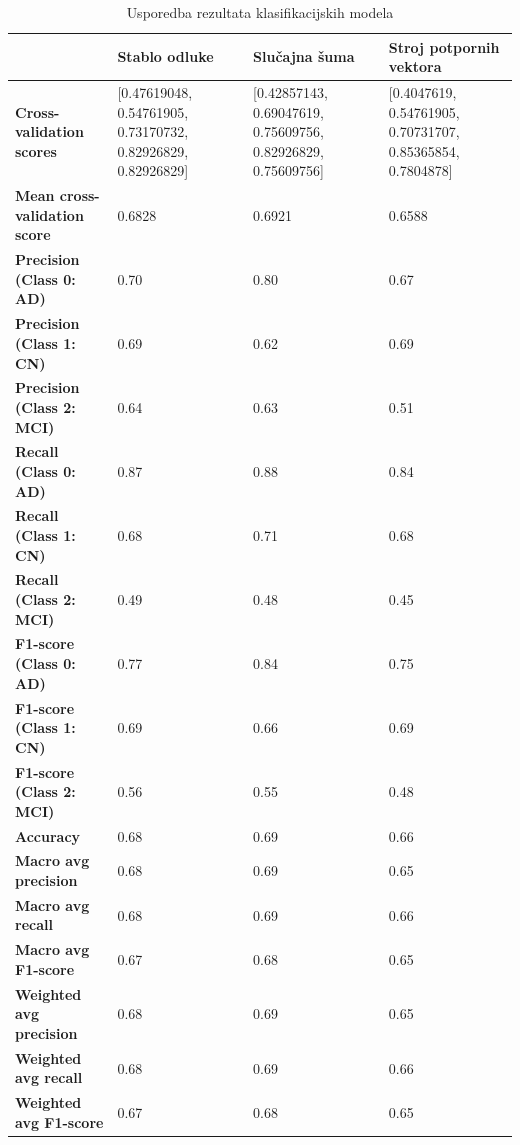 \documentclass[zavrsnirad,upload]{fer}
\begin{document}
\begin{table}[h!]
	\centering
	\begin{tabularx}{\textwidth}{|X|X|X|X|}
		\hline
		& \textbf{Stablo odluke} & \textbf{Slučajna šuma} & \textbf{Stroj potpornih vektora} \\ \hline
		\textbf{Cross-validation scores} & [0.47619048, 0.54761905, 0.73170732, 0.82926829, 0.82926829] & [0.42857143, 0.69047619, 0.75609756, 0.82926829, 0.75609756] & [0.4047619, 0.54761905, 0.70731707, 0.85365854, 0.7804878] \\ \hline
		\textbf{Mean cross-validation score} & 0.6828 & 0.6921 & 0.6588 \\ \hline
		\textbf{Precision (Class 0: AD)} & 0.70 & 0.80 & 0.67 \\ \hline
		\textbf{Precision (Class 1: CN)} & 0.69 & 0.62 & 0.69 \\ \hline
		\textbf{Precision (Class 2: MCI)} & 0.64 & 0.63 & 0.51 \\ \hline
		\textbf{Recall (Class 0: AD)} & 0.87 & 0.88 & 0.84 \\ \hline
		\textbf{Recall (Class 1: CN)} & 0.68 & 0.71 & 0.68 \\ \hline
		\textbf{Recall (Class 2: MCI)} & 0.49 & 0.48 & 0.45 \\ \hline
		\textbf{F1-score (Class 0: AD)} & 0.77 & 0.84 & 0.75 \\ \hline
		\textbf{F1-score (Class 1: CN)} & 0.69 & 0.66 & 0.69 \\ \hline
		\textbf{F1-score (Class 2: MCI)} & 0.56 & 0.55 & 0.48 \\ \hline
		\textbf{Accuracy} & 0.68 & 0.69 & 0.66 \\ \hline
		\textbf{Macro avg precision} & 0.68 & 0.69 & 0.65 \\ \hline
		\textbf{Macro avg recall} & 0.68 & 0.69 & 0.66 \\ \hline
		\textbf{Macro avg F1-score} & 0.67 & 0.68 & 0.65 \\ \hline
		\textbf{Weighted avg precision} & 0.68 & 0.69 & 0.65 \\ \hline
		\textbf{Weighted avg recall} & 0.68 & 0.69 & 0.66 \\ \hline
		\textbf{Weighted avg F1-score} & 0.67 & 0.68 & 0.65 \\ \hline
	\end{tabularx}
	\caption{Usporedba rezultata klasifikacijskih modela}
	\label{tab:classification_results}
\end{table}
\end{document}
